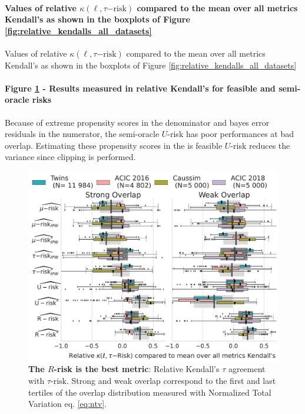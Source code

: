 \documentclass[french,12pt,twoside,a4paper]{book}
\begin{document}
\begin{appendices}
  \paragraph{Values of relative $\kappa(\ell,\tau\mathrm{{-risk}})$ compared to
    the mean over all metrics Kendall's as shown in the boxplots of Figure \ref{fig:relative_kendalls_all_datasets}}

  \begin{table}
    \centering
    \resizebox{0.7\textwidth}{!}{
      
    }
    \caption{Values of relative $\kappa(\ell,\tau\mathrm{{-risk}})$ compared to
      the mean over all metrics Kendall's as shown in the boxplots of Figure
      \ref{fig:relative_kendalls_all_datasets}}\label{apd:table:relative_kendalls_all_datasets}
  \end{table}


  \paragraph{Figure \ref{apd:fig:relative_kendalls_all_datasets_all_metrics} -
    Results measured in relative Kendall's for feasible and semi-oracle risks}

  Because of extreme propensity scores in the denominator and bayes error residuals in the numerator, the semi-oracle
  $U$-risk has poor performances at bad overlap. Estimating these propensity scores in the is feasible $U$-risk reduces
  the variance since clipping is performed.

  \begin{figure}[!b]
    \centering
    \includegraphics[width=\linewidth]{img/chapter_5/_1_r_risk_domination_r_risk_domination__ref_metric_mean_risks_by_Dataset.pdf}
    \caption{\textbf{The $R$-risk is the best metric}: Relative Kendall's $\tau$
      agreement with $\tau\text{-risk}$. Strong and weak overlap correspond to
      the first and last tertiles of the overlap distribution measured with
      Normalized Total Variation eq. \ref{eq:ntv}.
    }\label{apd:fig:relative_kendalls_all_datasets_all_metrics}
  \end{figure}


\end{appendices}
\end{document}
